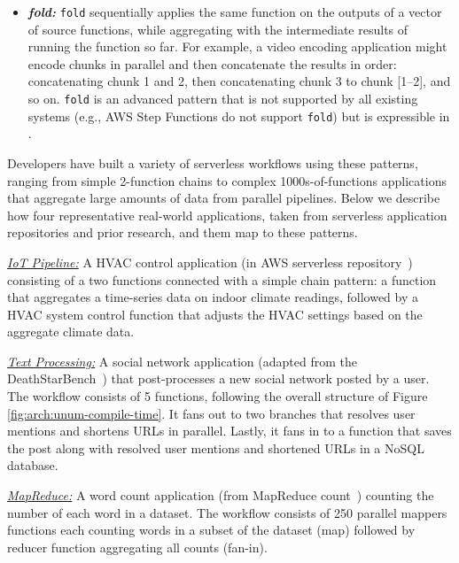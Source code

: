 \begin{itemize}
	\item \textit{\textbf{fold:}}
    \texttt{fold} sequentially applies the same function on the outputs of
    a vector of source functions, while aggregating with the intermediate
    results of running the function so far. For example, a video encoding
    application might encode chunks in parallel and then concatenate the
    results in order: concatenating chunk 1 and 2, then concatenating
    chunk 3 to chunk [1--2], and so on. \texttt{fold} is an advanced
    pattern that is not supported by all existing systems (e.g., AWS Step
    Functions do not support \texttt{fold}) but is expressible in \name{}.
\end{itemize}



Developers have built a variety of serverless workflows using these patterns,
ranging from simple 2-function chains to complex 1000s-of-functions
applications that aggregate large amounts of data from parallel pipelines.
Below we describe how four representative real-world applications, taken from
serverless application repositories and prior research, and them map to these
patterns.



\noindent\underline{\textit{IoT Pipeline:}} A HVAC control application (in
	AWS serverless repository~\cite{iot-pipeline}) consisting  of a
	two functions connected with a simple chain pattern: a function that aggregates  a time-series data
	on indoor climate readings,  followed by a HVAC system control function that
	adjusts the HVAC settings based on the aggregate climate data.
	
	\noindent \underline{\textit{Text Processing:}} A social network application (adapted from
	the DeathStarBench~\cite{deathstar}) that post-processes a new social network posted by a user.  The workflow consists of 5 functions, following the overall structure of Figure \ref{fig:arch:unum-compile-time}.
	It fans out to two branches that resolves user mentions and shortens URLs
	in parallel.  Lastly, it fans in to a function that saves the post along
	with resolved user mentions and shortened URLs in a NoSQL database.
	
	 \noindent \underline{\textit{MapReduce:}} A word count application (from MapReduce 
	count~\cite{mapreduce}) counting the number of each word in a dataset. The workflow consists of 250 parallel mappers functions each counting words in a subset of the dataset (map) followed by  reducer function aggregating all counts (fan-in).
	
